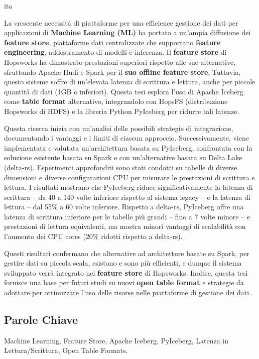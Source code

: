 \markboth{\abstractname}{}
\begin{scontents}[store-env=lang]
ita
\end{scontents}



\begin{scontents}[store-env=abstracts,print-env=true]
La crescente necessità di piattaforme per una efficience gestione dei dati per applicazioni di \textbf{Machine Learning (ML)} ha portato a un'ampia diffusione dei \textbf{feature store}, piattaforme dati centralizzate che supportano \textbf{feature engineering}, addestramento di modelli e inferenza. Il \textbf{feature store} di Hopsworks ha dimostrato prestazioni superiori rispetto alle sue alternative, sfruttando Apache Hudi e Spark per il \textbf{suo offline feature store}. Tuttavia, questo sisteme soffre di un'elevata latenza di scrittura e lettura, anche per piccole quantità di dati (1GB o inferiori). Questa tesi esplora l'uso di Apache Iceberg come \textbf{table format} alternativo, integrandolo con HopsFS (distribuzione Hopsworks di HDFS) e la libreria Python PyIceberg per ridurre tali latenze.

Questa ricerca inizia con un'analisi delle possibili strategie di integrazione, documentando i vantaggi e i limiti di ciascun approccio. Successivamente, viene implementata e valutata un'architettura basata su PyIceberg, confrontata con la soluzione esistente basata su Spark e con un'alternative basata su Delta Lake (delta-rs). Esperimenti approfonditi sono stati condotti su tabelle di diverse dimensioni e diverse configurazioni CPU per misurare le prestazioni di scrittura e lettura. I risultati mostrano che PyIceberg riduce significativamente la latenza di scrittura -- da 40 a 140 volte inferiore rispetto al sistema legacy -- e la latenza di lettura -- dal 55\% a 60 volte inferiore. Rispetto a delta-rs, PyIceberg offre una latenza di scrittura inferiore per le tabelle più grandi -- fino a 7 volte minore -- e prestazioni di lettura equivalenti, ma mostra minori vantaggi di scalabilità con l'aumento dei CPU cores (20\% ridotti rispetto a delta-rs).

Questi risultati confermano che alternative ad architetture basate su Spark, per gestire dati su piccola scala, esistono e sono più efficienti, e dunque il sistema sviluppato verrà integrato nel \textbf{feature store} di Hopsworks. Inoltre, questa tesi fornisce una base per futuri studi su nuovi \textbf{open table format} e strategie da adottare per ottimizzare l'uso delle risorse nelle piattaforme di gestione dei dati.
\end{scontents}



\subsection*{Parole Chiave}
\begin{scontents}[store-env=keywords,print-env=true]
Machine Learning, Feature Store, Apache Iceberg, PyIceberg, Latenza in Lettura/Scrittura, Open Table Formats.
\end{scontents}